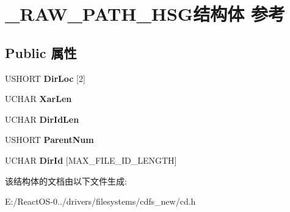 \hypertarget{struct___r_a_w___p_a_t_h___h_s_g}{}\section{\+\_\+\+R\+A\+W\+\_\+\+P\+A\+T\+H\+\_\+\+H\+S\+G结构体 参考}
\label{struct___r_a_w___p_a_t_h___h_s_g}
\subsection*{Public 属性}
\begin{DoxyCompactItemize}
\item 
\mbox{\label{struct___r_a_w___p_a_t_h___h_s_g_aa7a5cd56db2bf16710241a3ef1c49bfd}} 
U\+S\+H\+O\+RT {\bfseries Dir\+Loc} \mbox{[}2\mbox{]}
\item 
\mbox{\label{struct___r_a_w___p_a_t_h___h_s_g_ac95dbcbc9afc13df8e3ed7db72f99a04}} 
U\+C\+H\+AR {\bfseries Xar\+Len}
\item 
\mbox{\label{struct___r_a_w___p_a_t_h___h_s_g_a2636d67600dc8ef3170b3071b3ed692e}} 
U\+C\+H\+AR {\bfseries Dir\+Id\+Len}
\item 
\mbox{\label{struct___r_a_w___p_a_t_h___h_s_g_a5a096bfbe82115b46752f94e0a0e3f4f}} 
U\+S\+H\+O\+RT {\bfseries Parent\+Num}
\item 
\mbox{\label{struct___r_a_w___p_a_t_h___h_s_g_a8d3890577a0f17578c5b8a0b67b56838}} 
U\+C\+H\+AR {\bfseries Dir\+Id} \mbox{[}M\+A\+X\+\_\+\+F\+I\+L\+E\+\_\+\+I\+D\+\_\+\+L\+E\+N\+G\+TH\mbox{]}
\end{DoxyCompactItemize}


该结构体的文档由以下文件生成\+:\begin{DoxyCompactItemize}
\item 
E\+:/\+React\+O\+S-\/0../drivers/filesystems/cdfs\+\_\+new/cd.\+h\end{DoxyCompactItemize}

